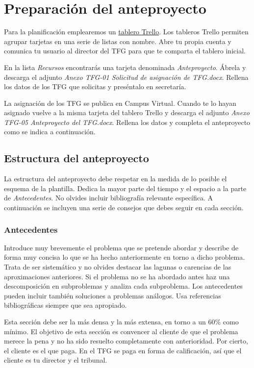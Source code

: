 \section{Preparación del anteproyecto}

Para la planificación emplearemos un \href{https://trello.com}{tablero Trello}. Los tableros Trello permiten agrupar tarjetas en una serie de listas con nombre.  Abre tu propia cuenta y comunica tu usuario al director del TFG para que te comparta el tablero inicial.

En la lista \emph{Recursos} encontrarás una tarjeta denominada \emph{Anteproyecto}.  Ábrela y descarga el adjunto \emph{Anexo TFG-01 Solicitud de asignación de TFG.docx}.  Rellena los datos de los TFG que solicitas y preséntalo en secretaría.

La asignación de los TFG se publica en Campus Virtual.  Cuando te lo hayan asignado vuelve a la misma tarjeta del tablero Trello y descarga el adjunto \emph{Anexo TFG-05 Anteproyecto del TFG.docx}.  Rellena los datos y completa el anteproyecto como se indica a continuación.

\subsection{Estructura del anteproyecto}

La estructura del anteproyecto debe respetar en la medida de lo posible el esquema de la plantilla.  Dedica la mayor parte del tiempo y el espacio a la parte de \emph{Antecedentes}.  No olvides incluir bibliografía relevante específica.  A continuación se incluyen una serie de consejos que debes seguir en cada sección.

\subsubsection{Antecedentes}

Introduce muy brevemente el problema que se pretende abordar y describe de forma muy concisa lo que se ha hecho anteriormente en torno a dicho problema.  Trata de ser sistemático y no olvides destacar las lagunas o carencias de las aproximaciones anteriores.  Si el problema no se ha abordado antes haz una descomposición en subproblemas y analiza cada subproblema.  Los antecedentes pueden incluir también soluciones a problemas análogos.  Usa referencias bibliográficas siempre que sea apropiado.  

Esta sección debe ser la más densa y la más extensa, en torno a un 60\% como mínimo. El objetivo de esta sección es convencer al cliente de que el problema merece la pena y no ha sido resuelto completamente con anterioridad.  Por cierto, el cliente es el que paga.  En el TFG se paga en forma de calificación, así que el cliente es tu director y el tribunal.

